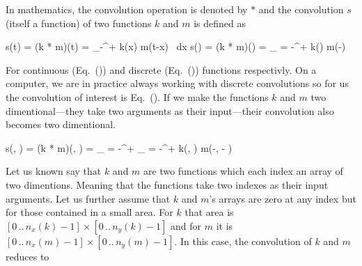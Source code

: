 \startplacefigure[reference=conv-operation,
                   title={The basic forward operation of a convolutional layer},
                   location=top]
{}{}
{}{}
{}{}
{}{}
{}{}
{}{}
{}{}
{}{}
\stopcombination
\stopplacefigure

\startsubsubsection[title=Where is the convolution?]
In mathematics, the convolution operation is denoted by $*$ and the convolution $s$ (itself a function) of two functions $k$ and $m$ is defined as

\startplaceformula[reference=cont-conv]
\startformula
s(t) = (k * m)(t) = \int_{{-}\infty}^{{+}\infty} k(x) \cdot m(t-x) \, {\rm d}x
\stopformula
\stopplaceformula
\startplaceformula[reference=disc-conv]
\startformula
s(\color[red]{x}) = (k * m)(\color[red]{x}) = \sum_{\color[blue]{x} = {-}\infty}^{{+}\infty} k(\color[blue]{x}) \cdot m(\color[red]{x}-\color[blue]{x})
\stopformula
\stopplaceformula

For continuous (Eq.~()) and discrete (Eq.~()) functions respectivly.
On a computer, we are in practice always working with discrete convolutions so for us the convolution of interest is Eq.~().
If we make the functions $k$ and $m$ two dimentional---they take two arguments as their input---their convolution also becomes two dimentional.

\startplaceformula[reference=twodim-disc-conv]
\startformula
s(\color[red]{x}, \color[red]{y}) = (k * m)(\color[red]{x}, \color[red]{y}) =
\sum_{\color[blue]{y} = {-}\infty}^{{+}\infty}
\sum_{\color[blue]{x} = {-}\infty}^{{+}\infty}
k(\color[blue]{x}, \color[blue]{y}) \cdot m(\color[red]{x}-\color[blue]{x}, \color[red]{y} - \color[blue]{y})
\stopformula
\stopplaceformula

\indentation
Let us known say that $k$ and $m$ are two functions which each index an array of two dimentions.
Meaning that the functions take two indexes as their input arguments.
Let us further assume that $k$ and $m$'s arrays are zero at any index but for those contained in a small area.
For $k$ that area is $[0 \, .. \, n_x(k) - 1] \times [0 \, .. \, n_y(k) - 1]$ and for $m$ it is $[0 \, .. \, n_x(m) - 1] \times [0 \, .. \, n_y(m) - 1]$.
In this case, the convolution of $k$ and $m$ reduces to

